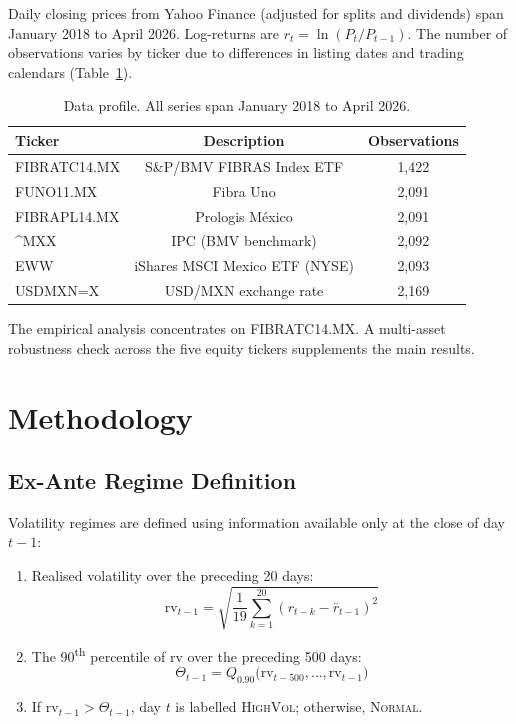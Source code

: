 \documentclass[12pt,a4paper]{article}
\newcommand{\hl}{\textsc{HighVol}}
\newcommand{\nor}{\textsc{Normal}}
\begin{document}
Daily closing prices from Yahoo Finance (adjusted for splits and dividends) span January 2018 to April 2026. Log-returns are $r_t = \ln(P_t / P_{t-1})$. The number of observations varies by ticker due to differences in listing dates and trading calendars (Table~\ref{tab:data}).

\begin{table}[H]
\centering
\caption{Data profile. All series span January 2018 to April 2026.}
\label{tab:data}
\begin{tabular}{lcc}
\toprule
Ticker & Description & Observations \\
\midrule
FIBRATC14.MX & S\&P/BMV FIBRAS Index ETF           & 1,422 \\
FUNO11.MX     & Fibra Uno                               & 2,091 \\
FIBRAPL14.MX & Prologis M\'exico                    & 2,091 \\
\^{}MXX       & IPC (BMV benchmark)                   & 2,092 \\
EWW           & iShares MSCI Mexico ETF (NYSE)        & 2,093 \\
USDMXN=X      & USD/MXN exchange rate                 & 2,169 \\
\bottomrule
\end{tabular}
\end{table}

The empirical analysis concentrates on FIBRATC14.MX. A multi-asset robustness check across the five equity tickers supplements the main results.

\section{Methodology}

\subsection{Ex-Ante Regime Definition}

Volatility regimes are defined using information available only at the close of day $t-1$:

\begin{enumerate}
    \item Realised volatility over the preceding 20 days:
    \begin{equation}
    \mathrm{rv}_{t-1} = \sqrt{\frac{1}{19} \sum_{k=1}^{20} (r_{t-k} - \bar{r}_{t-1})^{2}} \label{eq:rv}
    \end{equation}
    \item The 90\textsuperscript{th} percentile of $\mathrm{rv}$ over the preceding 500 days:
    \begin{equation}
    \Theta_{t-1} = Q_{0.90}\bigl( \mathrm{rv}_{t-500}, \dots, \mathrm{rv}_{t-1} \bigr) \label{eq:theta}
    \end{equation}
    \item If $\mathrm{rv}_{t-1} > \Theta_{t-1}$, day $t$ is labelled \hl{}; otherwise, \nor{}.
\end{enumerate}
\end{document}
